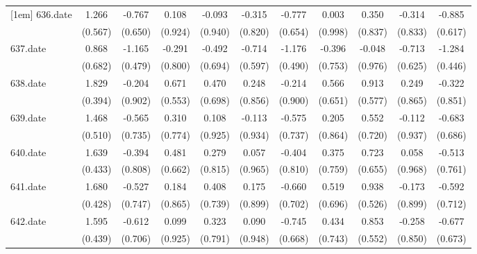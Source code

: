 \begin{tabular}{l*{10}{c}}
[1em]
636.date    &       1.266&      -0.767&       0.108&      -0.093&      -0.315&      -0.777&       0.003&       0.350&      -0.314&      -0.885\\
            &     (0.567)&     (0.650)&     (0.924)&     (0.940)&     (0.820)&     (0.654)&     (0.998)&     (0.837)&     (0.833)&     (0.617)\\
[1em]
637.date    &       0.868&      -1.165&      -0.291&      -0.492&      -0.714&      -1.176&      -0.396&      -0.048&      -0.713&      -1.284\\
            &     (0.682)&     (0.479)&     (0.800)&     (0.694)&     (0.597)&     (0.490)&     (0.753)&     (0.976)&     (0.625)&     (0.446)\\
[1em]
638.date    &       1.829&      -0.204&       0.671&       0.470&       0.248&      -0.214&       0.566&       0.913&       0.249&      -0.322\\
            &     (0.394)&     (0.902)&     (0.553)&     (0.698)&     (0.856)&     (0.900)&     (0.651)&     (0.577)&     (0.865)&     (0.851)\\
[1em]
639.date    &       1.468&      -0.565&       0.310&       0.108&      -0.113&      -0.575&       0.205&       0.552&      -0.112&      -0.683\\
            &     (0.510)&     (0.735)&     (0.774)&     (0.925)&     (0.934)&     (0.737)&     (0.864)&     (0.720)&     (0.937)&     (0.686)\\
[1em]
640.date    &       1.639&      -0.394&       0.481&       0.279&       0.057&      -0.404&       0.375&       0.723&       0.058&      -0.513\\
            &     (0.433)&     (0.808)&     (0.662)&     (0.815)&     (0.965)&     (0.810)&     (0.759)&     (0.655)&     (0.968)&     (0.761)\\
[1em]
641.date    &       1.680&      -0.527&       0.184&       0.408&       0.175&      -0.660&       0.519&       0.938&      -0.173&      -0.592\\
            &     (0.428)&     (0.747)&     (0.865)&     (0.739)&     (0.899)&     (0.702)&     (0.696)&     (0.526)&     (0.899)&     (0.712)\\
[1em]
642.date    &       1.595&      -0.612&       0.099&       0.323&       0.090&      -0.745&       0.434&       0.853&      -0.258&      -0.677\\
            &     (0.439)&     (0.706)&     (0.925)&     (0.791)&     (0.948)&     (0.668)&     (0.743)&     (0.552)&     (0.850)&     (0.673)\\

\end{tabular}

